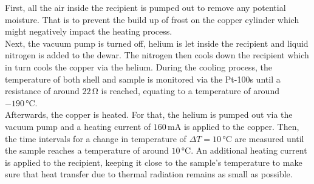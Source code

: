 First, all the air inside the recipient is pumped out to remove any potential moisture. That is to prevent the build up of frost on the copper cylinder which might negatively impact the heating process. \\
Next, the vacuum pump is turned off, helium is let inside the recipient and liquid nitrogen is added to the dewar.
The nitrogen then cools down the recipient which in turn cools the copper via the helium.
During the cooling process, the temperature of both shell and sample is monitored via the Pt-100s until a resistance of around $22 \,\si{\ohm}$ is reached, equating to a temperature of around $-190 \,\si{\celsius}$. \\

Afterwards, the copper is heated. For that, the helium is pumped out via the vacuum pump and a heating current of $160 \,\si{\milli\ampere}$ is applied to the copper.
Then, the time intervals for a change in temperature of $\Delta T = 10 \,\si{\celsius}$ are measured until the sample reaches a temperature of around $10 \,\si{\celsius}$.
An additional heating current is applied to the recipient, keeping it close to the sample's temperature to make sure that heat transfer due to thermal radiation remains as small as possible.